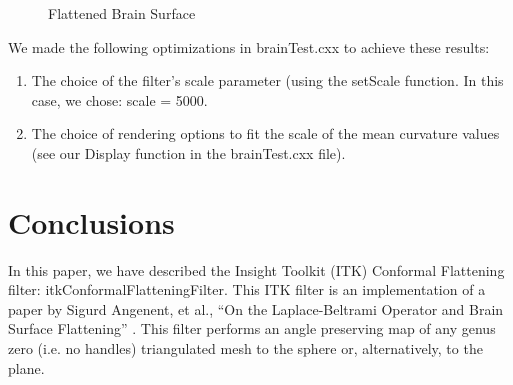 \documentclass{InsightArticle}
\begin{document}
  \begin{figure}[h]
		\begin{center}
    \end{center}
    \vspace{-.25in} \caption{Flattened Brain Surface}
  \end{figure}  

  We made the following optimizations in brainTest.cxx to achieve
  these results:

  \begin{enumerate}
  \item The choice of the filter's scale parameter (using the setScale
  function. In this case, we chose: scale = 5000.
  \item The choice of rendering options to fit the scale of the mean
  curvature values (see our Display function in the brainTest.cxx
  file).
  \end{enumerate}

	\section{Conclusions}
	In this paper, we have described the Insight Toolkit (ITK) Conformal
	Flattening filter: itkConformalFlatteningFilter. This ITK filter is
	an implementation of a paper by Sigurd Angenent, et al., ``On the
	Laplace-Beltrami Operator and Brain Surface Flattening''
	\cite{angenent1999lbo}. This filter performs an angle preserving map
	of any genus zero (i.e. no handles) triangulated mesh to the sphere
	or, alternatively, to the plane.
\end{document}
